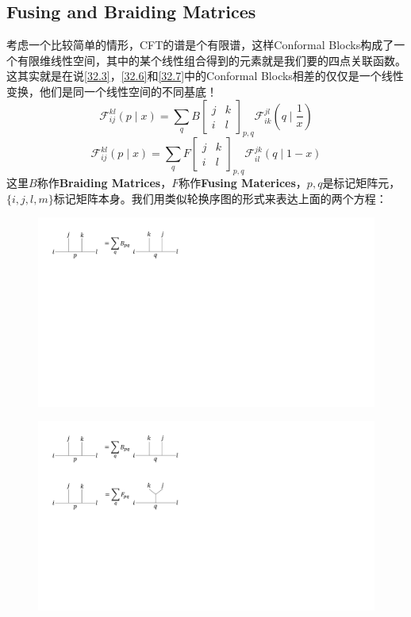 \subsection{Fusing and Braiding Matrices}
考虑一个比较简单的情形，CFT的谱是个有限谱，这样Conformal Blocks构成了一个有限维线性空间，其中的某个线性组合得到的元素就是我们要的四点关联函数。这其实就是在说\ref{32.3}，\ref{32.6}和\ref{32.7}中的Conformal Blocks相差的仅仅是一个线性变换，他们是同一个线性空间的不同基底！
\begin{equation}
	\mathcal{F}_{ij}^{kl}(p\mid x)=\sum_qB{\left[\begin{smallmatrix}j&k\\i&l\end{smallmatrix}\right]}_{p,q}\mathcal{F}_{ik}^{jl}\!\left(q\mid\frac1x\right)
\end{equation}
\begin{equation}
	\mathcal{F}_{ij}^{kl}(p\mid x)=\sum_qF{\left[\begin{array}{cc}j&k\\i&l\end{array}\right]}_{p,q}\mathcal{F}_{il}^{jk}(q\mid1-x)
\end{equation}
这里$B$称作\textbf{Braiding Matrices}，$F$称作\textbf{Fusing Materices}，$p,q$是标记矩阵元，$\{i,j,l,m\}$标记矩阵本身。我们用类似轮换序图的形式来表达上面的两个方程：
\begin{figure}[H]
	\centering
	\includegraphics[width=0.8\linewidth]{figs/fig11.pdf}
\end{figure}
\begin{figure}[H]
	\centering
	\includegraphics[width=0.8\linewidth]{figs/fig12.pdf}
\end{figure}
